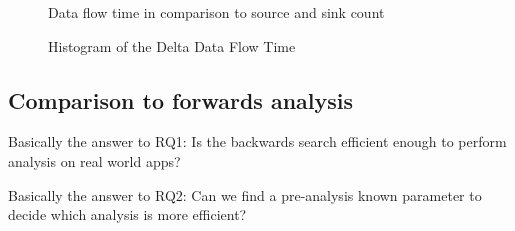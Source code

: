 \documentclass[../draft.tex]{subfiles}
\begin{document}
    \begin{figure}
        \centering
        \begin{subfigure}[]{0.45\textwidth}
            \centering
            \resizebox{\columnwidth}{!}{
                
            }
        \end{subfigure}
        \qquad
        \begin{subfigure}[]{0.45\textwidth}
            \centering
            \resizebox{\columnwidth}{!}{
                
            }
        \end{subfigure}
        \qquad
        \begin{subfigure}[]{0.45\textwidth}
            \centering
            \resizebox{\columnwidth}{!}{
                
            }
        \end{subfigure}
        \qquad
        \begin{subfigure}[]{0.45\textwidth}
            \centering
            \resizebox{\columnwidth}{!}{
                
            }
        \end{subfigure}
        \caption{Data flow time in comparison to source and sink count}
    \end{figure}

    \begin{figure}
        \centering
        \resizebox{0.75\columnwidth}{!}{
            
        }
        \caption{Histogram of the Delta Data Flow Time}
    \end{figure}


    \subsection{Comparison to forwards analysis}
    Basically the answer to RQ1: Is the backwards search efficient enough to perform analysis on real world apps?


    Basically the answer to RQ2: Can we find a pre-analysis known parameter to decide which analysis is more efficient?
\end{document}
